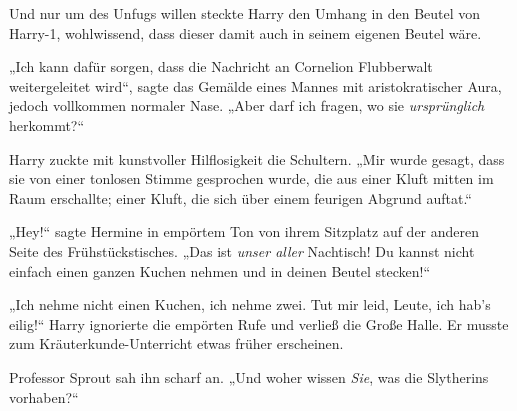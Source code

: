 Und nur um des Unfugs willen steckte Harry den Umhang in den Beutel von Harry-1, wohlwissend, dass dieser damit auch in seinem eigenen Beutel wäre.

\later

„Ich kann dafür sorgen, dass die Nachricht an Cornelion Flubberwalt weitergeleitet wird“, sagte das Gemälde eines Mannes mit aristokratischer Aura, jedoch vollkommen normaler Nase.
„Aber darf ich fragen, wo sie \emph{ursprünglich} herkommt?“

Harry zuckte mit kunstvoller Hilflosigkeit die Schultern.
„Mir wurde gesagt, dass sie von einer tonlosen Stimme gesprochen wurde, die aus einer Kluft mitten im Raum erschallte; einer Kluft, die sich über einem feurigen Abgrund auftat.“

\later

„Hey!“ sagte Hermine in empörtem Ton von ihrem Sitzplatz auf der anderen Seite des Frühstückstisches.
„Das ist \emph{unser aller} Nachtisch! Du kannst nicht einfach einen ganzen Kuchen nehmen und in deinen Beutel stecken!“

„Ich nehme nicht einen Kuchen, ich nehme zwei. Tut mir leid, Leute, ich hab’s eilig!“ Harry ignorierte die empörten Rufe und verließ die Große Halle. Er musste zum Kräuterkunde-Unterricht etwas früher erscheinen.

\later

Professor Sprout sah ihn scharf an.
„Und woher wissen \emph{Sie}, was die Slytherins vorhaben?“

